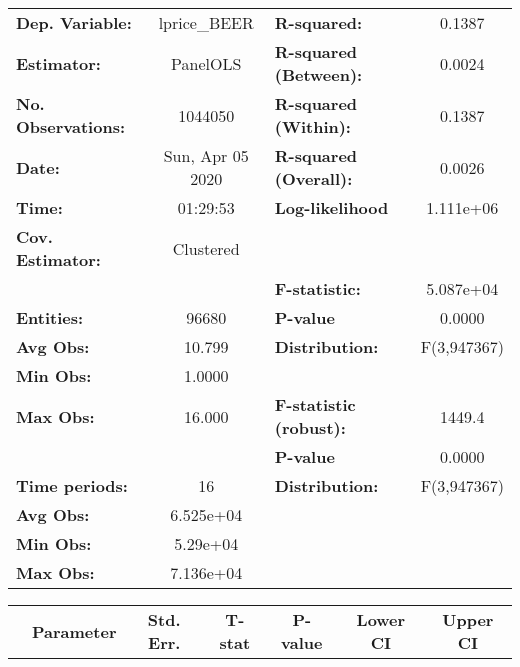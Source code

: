 \documentclass{report}
\begin{document}
\begin{center}
\begin{tabular}{lclc}
\toprule
\textbf{Dep. Variable:}    &    lprice\_BEER    & \textbf{  R-squared:         }   &      0.1387      \\
\textbf{Estimator:}        &      PanelOLS      & \textbf{  R-squared (Between):}  &      0.0024      \\
\textbf{No. Observations:} &      1044050       & \textbf{  R-squared (Within):}   &      0.1387      \\
\textbf{Date:}             &  Sun, Apr 05 2020  & \textbf{  R-squared (Overall):}  &      0.0026      \\
\textbf{Time:}             &      01:29:53      & \textbf{  Log-likelihood     }   &    1.111e+06     \\
\textbf{Cov. Estimator:}   &     Clustered      & \textbf{                     }   &                  \\
\textbf{}                  &                    & \textbf{  F-statistic:       }   &    5.087e+04     \\
\textbf{Entities:}         &       96680        & \textbf{  P-value            }   &      0.0000      \\
\textbf{Avg Obs:}          &       10.799       & \textbf{  Distribution:      }   &   F(3,947367)    \\
\textbf{Min Obs:}          &       1.0000       & \textbf{                     }   &                  \\
\textbf{Max Obs:}          &       16.000       & \textbf{  F-statistic (robust):} &      1449.4      \\
\textbf{}                  &                    & \textbf{  P-value            }   &      0.0000      \\
\textbf{Time periods:}     &         16         & \textbf{  Distribution:      }   &   F(3,947367)    \\
\textbf{Avg Obs:}          &     6.525e+04      & \textbf{                     }   &                  \\
\textbf{Min Obs:}          &      5.29e+04      & \textbf{                     }   &                  \\
\textbf{Max Obs:}          &     7.136e+04      & \textbf{                     }   &                  \\
\bottomrule
\end{tabular}
\begin{tabular}{lcccccc}
                           & \textbf{Parameter} & \textbf{Std. Err.} & \textbf{T-stat} & \textbf{P-value} & \textbf{Lower CI} & \textbf{Upper CI}  \\

\end{tabular}
\end{center}
\end{document}
